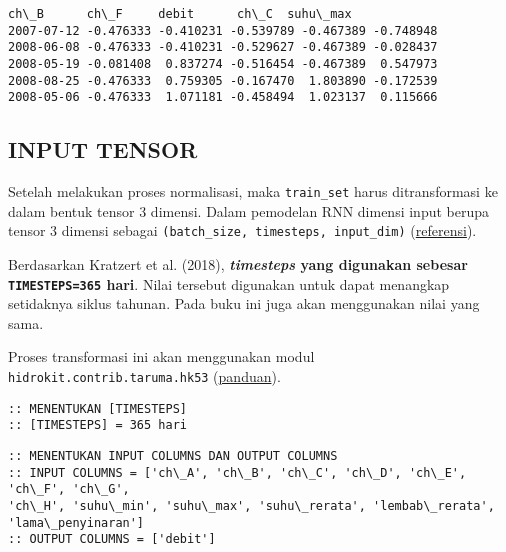 \documentclass[11pt]{article}
\makeatletter
\newcommand{\boxspacing}{\kern\kvtcb@left@rule\kern\kvtcb@boxsep}
\newcommand{\prompt}[4]{
        \ttfamily\llap{{\color{#2}[#3]:\hspace{3pt}#4}}\vspace{-\baselineskip}
    }
\makeatother
\begin{document}
            \begin{tcolorbox}[breakable, size=fbox, boxrule=.5pt, pad at break*=1mm, opacityfill=0]
\prompt{Out}{outcolor}{45}{\boxspacing}
\begin{Verbatim}[commandchars=\\\{\}]
                ch\_B      ch\_F     debit      ch\_C  suhu\_max
2007-07-12 -0.476333 -0.410231 -0.539789 -0.467389 -0.748948
2008-06-08 -0.476333 -0.410231 -0.529627 -0.467389 -0.028437
2008-05-19 -0.081408  0.837274 -0.516454 -0.467389  0.547973
2008-08-25 -0.476333  0.759305 -0.167470  1.803890 -0.172539
2008-05-06 -0.476333  1.071181 -0.458494  1.023137  0.115666
\end{Verbatim}
\end{tcolorbox}
        
    \hypertarget{input-tensor}{%
\subsection{INPUT TENSOR}\label{input-tensor}}

Setelah melakukan proses normalisasi, maka \texttt{train\_set} harus
ditransformasi ke dalam bentuk tensor 3 dimensi. Dalam pemodelan RNN
dimensi input berupa tensor 3 dimensi sebagai
\texttt{(batch\_size,\ timesteps,\ input\_dim)}
(\href{https://keras.io/layers/recurrent/}{referensi}).

Berdasarkan Kratzert et al. (2018), \textbf{\emph{timesteps} yang
digunakan sebesar \texttt{TIMESTEPS=365} hari}. Nilai tersebut digunakan
untuk dapat menangkap setidaknya siklus tahunan. Pada buku ini juga akan
menggunakan nilai yang sama.

Proses transformasi ini akan menggunakan modul
\texttt{hidrokit.contrib.taruma.hk53}
(\href{https://nbviewer.jupyter.org/gist/taruma/50460ebfaab5a30c41e7f1a1ac0853e2}{panduan}).

    \begin{Verbatim}[commandchars=\\\{\}]
:: MENENTUKAN [TIMESTEPS]
:: [TIMESTEPS] = 365 hari
    \end{Verbatim}

    \begin{Verbatim}[commandchars=\\\{\}]
:: MENENTUKAN INPUT COLUMNS DAN OUTPUT COLUMNS
:: INPUT COLUMNS = ['ch\_A', 'ch\_B', 'ch\_C', 'ch\_D', 'ch\_E', 'ch\_F', 'ch\_G',
'ch\_H', 'suhu\_min', 'suhu\_max', 'suhu\_rerata', 'lembab\_rerata',
'lama\_penyinaran']
:: OUTPUT COLUMNS = ['debit']
    \end{Verbatim}
\end{document}
